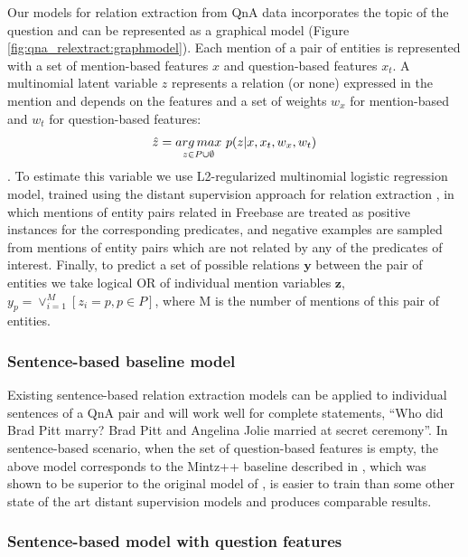Our models for relation extraction from QnA data incorporates the topic of the question and can be represented as a graphical model (Figure \ref{fig:qna_relextract:graphmodel}).
Each mention of a pair of entities is represented with a set of mention-based features $x$ and question-based features $x_t$.
A multinomial latent variable $z$ represents a relation (or none) expressed in the mention and depends on the features and a set of weights $w_x$ for mention-based and $w_t$ for question-based features:
$$\hat{z}=\underset{z \in P \cup \emptyset}{arg\,max}\,\, p(z|x, x_t, w_x, w_t)$$.
To estimate this variable we use L2-regularized multinomial logistic regression model, trained using the distant supervision approach for relation extraction \cite{MintzBSJ09}, in which mentions of entity pairs related in Freebase are treated as positive instances for the corresponding predicates, and negative examples are sampled from mentions of entity pairs which are not related by any of the predicates of interest.
Finally, to predict a set of possible relations $\mathbf{y}$ between the pair of entities we take logical OR of individual mention variables $\mathbf{z}$, \ie $y_p = \lor_{i=1}^M [z_i = p, p \in P]$, where M is the number of mentions of this pair of entities.

\subsubsection{Sentence-based baseline model}

Existing sentence-based relation extraction models can be applied to individual sentences of a QnA pair and will work well for complete statements, \eg ``Who did Brad Pitt marry? Brad Pitt and Angelina Jolie married at secret ceremony''.
In sentence-based scenario, when the set of question-based features is empty, the above model corresponds to the Mintz++ baseline described in \cite{Surdeanu:2012:MML:2390948.2391003}, which was shown to be superior to the original model of \cite{MintzBSJ09}, is easier to train than some other state of the art distant supervision models and produces comparable results.

\subsubsection{Sentence-based model with question features}


